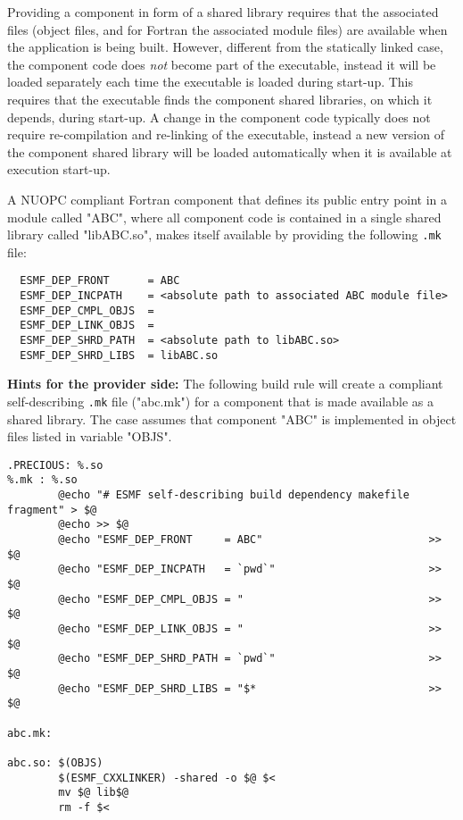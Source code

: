 Providing a component in form of a shared library requires that the associated files (object files, and for Fortran the associated module files) are available when the application is being built. However, different from the statically linked case, the component code does {\em not} become part of the executable, instead it will be loaded separately each time the executable is loaded during start-up. This requires that the executable finds the component shared libraries, on which it depends, during start-up. A change in the component code typically does not require re-compilation and re-linking of the executable, instead a new version of the component shared library will be loaded automatically when it is available at execution start-up.

A NUOPC compliant Fortran component that defines its public entry point in a module called "ABC", where all component code is contained in a single shared library called "libABC.so", makes itself available by providing the following {\tt .mk} file:

\begin{verbatim}
  ESMF_DEP_FRONT      = ABC
  ESMF_DEP_INCPATH    = <absolute path to associated ABC module file>
  ESMF_DEP_CMPL_OBJS  = 
  ESMF_DEP_LINK_OBJS  = 
  ESMF_DEP_SHRD_PATH  = <absolute path to libABC.so>
  ESMF_DEP_SHRD_LIBS  = libABC.so
\end{verbatim}

{\bf Hints for the provider side:} The following build rule will create a compliant self-describing {\tt .mk} file ("abc.mk") for a component that is made available as a shared library. The case assumes that component "ABC" is implemented in object files listed in variable "OBJS".

\begin{verbatim}
.PRECIOUS: %.so
%.mk : %.so
        @echo "# ESMF self-describing build dependency makefile fragment" > $@
        @echo >> $@
        @echo "ESMF_DEP_FRONT     = ABC"                          >> $@
        @echo "ESMF_DEP_INCPATH   = `pwd`"                        >> $@
        @echo "ESMF_DEP_CMPL_OBJS = "                             >> $@
        @echo "ESMF_DEP_LINK_OBJS = "                             >> $@
        @echo "ESMF_DEP_SHRD_PATH = `pwd`"                        >> $@
        @echo "ESMF_DEP_SHRD_LIBS = "$*                           >> $@

abc.mk:

abc.so: $(OBJS)
        $(ESMF_CXXLINKER) -shared -o $@ $<
        mv $@ lib$@
        rm -f $<
\end{verbatim}


